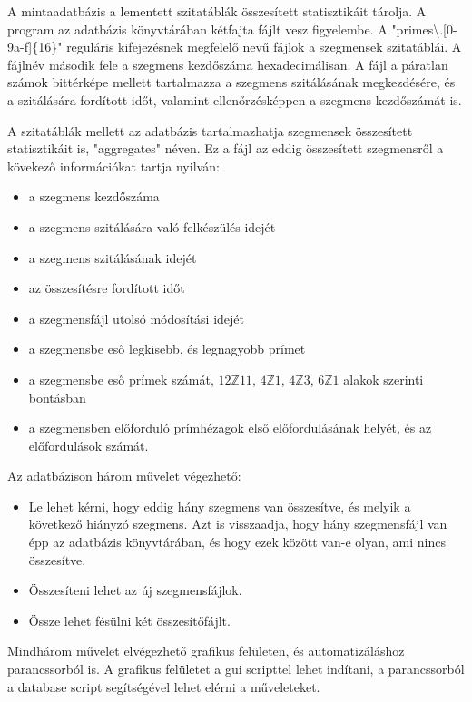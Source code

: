 \documentclass[12pt]{report}
\begin{document}
A mintaadatbázis a lementett szitatáblák összesített statisztikáit tárolja.
A program az adatbázis könyvtárában kétfajta fájlt vesz figyelembe.
A "primes\textbackslash.[0-9a-f]\{16\}" reguláris kifejezésnek megfelelő nevű
fájlok a szegmensek szitatáblái.
A fájlnév második fele a szegmens kezdőszáma hexadecimálisan.
A fájl a páratlan számok bittérképe mellett tartalmazza a szegmens
szitálásának megkezdésére, és a szitálására fordított időt,
valamint ellenőrzésképpen a szegmens kezdőszámát is.

A szitatáblák mellett az adatbázis tartalmazhatja szegmensek összesített
statisztikáit is, "aggregates" néven. Ez a fájl az eddig összesített
szegmensről a kövekező információkat tartja nyilván:
\begin{itemize}
\item a szegmens kezdőszáma
\item a szegmens szitálására való felkészülés idejét
\item a szegmens szitálásának idejét
\item az összesítésre fordított időt
\item a szegmensfájl utolsó módosítási idejét
\item a szegmensbe eső legkisebb, és legnagyobb prímet
\item a szegmensbe eső prímek számát,
$12\mathbb{Z}11$, $4\mathbb{Z}1$, $4\mathbb{Z}3$, $6\mathbb{Z}1$ alakok szerinti bontásban
\item a szegmensben előforduló prímhézagok első előfordulásának helyét,
és az előfordulások számát.
\end{itemize}

Az adatbázison három művelet végezhető:
\begin{itemize}

\item Le lehet kérni, hogy eddig hány szegmens van összesítve,
és melyik a következő hiányzó szegmens.
Azt is visszaadja, hogy hány szegmensfájl van épp az adatbázis könyvtárában,
és hogy ezek között van-e olyan, ami nincs összesítve.

\item Összesíteni lehet az új szegmensfájlok.

\item Össze lehet fésülni két összesítőfájlt.

\end{itemize}

Mindhárom művelet elvégezhető grafikus felületen, és automatizáláshoz parancssorból is.
A grafikus felületet a gui scripttel lehet indítani, a parancssorból
a database script segítségével lehet elérni a műveleteket.
\end{document}
